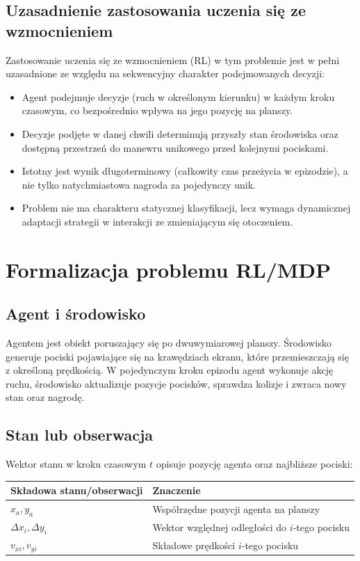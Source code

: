 \documentclass[12pt]{article}
\begin{document}
\subsection{Uzasadnienie zastosowania uczenia się ze wzmocnieniem}
Zastosowanie uczenia się ze wzmocnieniem (RL) w tym problemie jest w pełni uzasadnione ze względu na sekwencyjny charakter podejmowanych decyzji:
\begin{itemize}
    \item Agent podejmuje decyzje (ruch w określonym kierunku) w każdym kroku czasowym, co bezpośrednio wpływa na jego pozycję na planszy.
    \item Decyzje podjęte w danej chwili determinują przyszły stan środowiska oraz dostępną przestrzeń do manewru unikowego przed kolejnymi pociskami.
    \item Istotny jest wynik długoterminowy (całkowity czas przeżycia w epizodzie), a nie tylko natychmiastowa nagroda za pojedynczy unik.
    \item Problem nie ma charakteru statycznej klasyfikacji, lecz wymaga dynamicznej adaptacji strategii w interakcji ze zmieniającym się otoczeniem.
\end{itemize}

\section{Formalizacja problemu RL/MDP}

\subsection{Agent i środowisko}
Agentem jest obiekt poruszający się po dwuwymiarowej planszy. Środowisko generuje pociski pojawiające się na krawędziach ekranu, które przemieszczają się z określoną prędkością. W pojedynczym kroku epizodu agent wykonuje akcję ruchu, środowisko aktualizuje pozycje pocisków, sprawdza kolizje i zwraca nowy stan oraz nagrodę.

\subsection{Stan lub obserwacja}
Wektor stanu w kroku czasowym $t$ opisuje pozycję agenta oraz najbliższe pociski:

\begin{center}
\begin{tabular}{p{}p{}}
\toprule
Składowa stanu/obserwacji & Znaczenie \\
\midrule
$x_a, y_a$ & Współrzędne pozycji agenta na planszy \\
$\Delta x_i, \Delta y_i$ & Wektor względnej odległości do $i$-tego pocisku \\
$v_{xi}, v_{yi}$ & Składowe prędkości $i$-tego pocisku \\
\bottomrule
\end{tabular}
\end{center}
\end{document}
